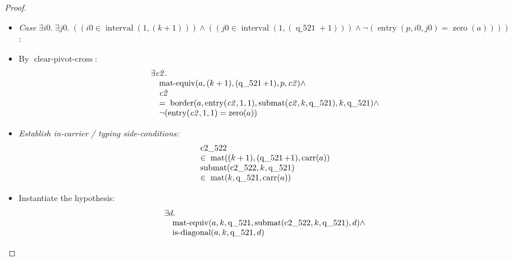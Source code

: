 \documentclass[11pt]{article}
\theoremstyle{plain}
\begin{document}
\begin{proof}
\begin{itemize}[leftmargin=2.8em, itemsep=4pt, parsep=1pt]
  \item[]\emph{Case} $\exists \mathit{i0}.\; \exists \mathit{j0}.\; ((\mathit{i0} \in \operatorname{interval}(1, (k + 1))) \wedge ((\mathit{j0} \in \operatorname{interval}(1, (\operatorname{q\_521} + 1))) \wedge \neg (\operatorname{entry}(p, \mathit{i0}, \mathit{j0}) = \operatorname{zero}(a))))$:
  \item[\textbf{76}] By $\operatorname{clear\text{-}pivot\text{-}cross}$:
\begin{equation*}
\begin{array}{@{}l@{}} \exists \mathit{c2}. \\ \quad \operatorname{mat\text{-}equiv}(a, (k + 1), (\operatorname{q\_521} + 1), p, \mathit{c2}) \wedge \\ \quad \mathit{c2} \\ \quad =\; \operatorname{border}(a, \operatorname{entry}(\mathit{c2}, 1, 1), \operatorname{submat}(\mathit{c2}, k, \operatorname{q\_521}), k, \operatorname{q\_521}) \wedge \\ \quad \neg (\operatorname{entry}(\mathit{c2}, 1, 1) = \operatorname{zero}(a)) \end{array}
\end{equation*}

  \item[\textbf{77--81}] \emph{Establish in-carrier / typing side-conditions:}
\begin{equation*}
\begin{array}{@{}l@{}}
\begin{array}{@{}l@{}} \operatorname{c2\_522} \\ \in\; \operatorname{mat}((k + 1), (\operatorname{q\_521} + 1), \operatorname{carr}(a)) \end{array} \\
\begin{array}{@{}l@{}} \operatorname{submat}(\operatorname{c2\_522}, k, \operatorname{q\_521}) \\ \in\; \operatorname{mat}(k, \operatorname{q\_521}, \operatorname{carr}(a)) \end{array}
\end{array}
\end{equation*}

  \item[\textbf{82--83}] Instantiate the hypothesis:
\begin{equation*}
\begin{array}{@{}l@{}} \exists d. \\ \quad \operatorname{mat\text{-}equiv}(a, k, \operatorname{q\_521}, \operatorname{submat}(\operatorname{c2\_522}, k, \operatorname{q\_521}), d) \wedge \\ \quad \operatorname{is\text{-}diagonal}(a, k, \operatorname{q\_521}, d) \end{array}
\end{equation*}


\end{itemize}
\end{proof}
\end{document}
